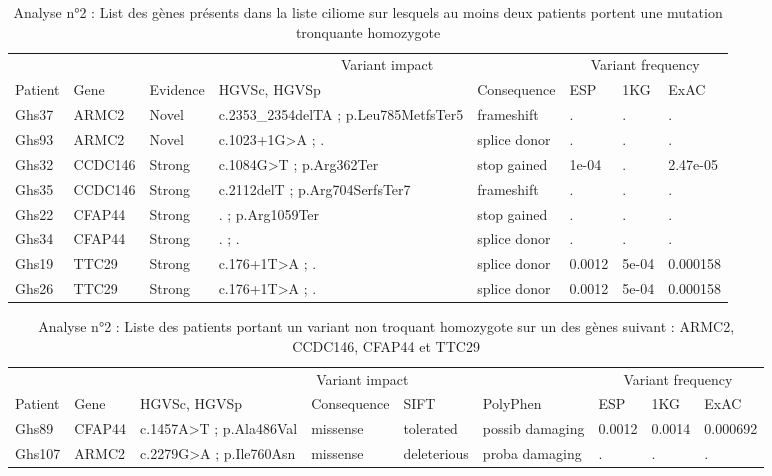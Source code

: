\documentclass[12pt,twoside]{reedthesis}
\theoremstyle{definition}
\theoremstyle{definition}
\theoremstyle{remark}
\begin{document}
  \begin{landscape}
  \begin{longtable}[t]{llllllll}
  \caption{\label{tab:tabgrp1high}Analyse n°2 : List des gènes présents dans la liste ciliome sur lesquels au moins deux patients portent une mutation tronquante homozygote}\\
  \toprule
  \multicolumn{1}{c}{ } & \multicolumn{1}{c}{ } & \multicolumn{1}{c}{ } & \multicolumn{2}{c}{Variant impact} & \multicolumn{3}{c}{Variant frequency} \\
  \cmidrule(l{2pt}r{2pt}){4-5} \cmidrule(l{2pt}r{2pt}){6-8}
  Patient & Gene & Evidence & HGVSc, HGVSp & Consequence & ESP & 1KG & ExAC\\
  \midrule
  Ghs37 & ARMC2 & Novel & c.2353\_2354delTA ; p.Leu785MetfsTer5 & frameshift & . & . & .\\
  Ghs93 & ARMC2 & Novel & c.1023+1G>A ; . & splice donor & . & . & .\\
  Ghs32 & CCDC146 & Strong & c.1084G>T ; p.Arg362Ter & stop gained & 1e-04 & . & 2.47e-05\\
  Ghs35 & CCDC146 & Strong & c.2112delT ; p.Arg704SerfsTer7 & frameshift & . & . & .\\
  Ghs22 & CFAP44 & Strong & . ; p.Arg1059Ter & stop gained & . & . & .\\
  \addlinespace
  Ghs34 & CFAP44 & Strong & . ; . & splice donor & . & . & .\\
  Ghs19 & TTC29 & Strong & c.176+1T>A ; . & splice donor & 0.0012 & 5e-04 & 0.000158\\
  Ghs26 & TTC29 & Strong & c.176+1T>A ; . & splice donor & 0.0012 & 5e-04 & 0.000158\\
  \bottomrule
  \end{longtable}
  \end{landscape}
  
  \begin{landscape}
  \begin{longtable}[t]{lllllllll}
  \caption{\label{tab:tabgrp1moderate}Analyse n°2 : Liste des patients portant un variant non troquant homozygote sur un des gènes suivant : ARMC2, CCDC146, CFAP44  et  TTC29}\\
  \toprule
  \multicolumn{1}{c}{ } & \multicolumn{1}{c}{ } & \multicolumn{4}{c}{Variant impact} & \multicolumn{3}{c}{Variant frequency} \\
  \cmidrule(l{2pt}r{2pt}){3-6} \cmidrule(l{2pt}r{2pt}){7-9}
  Patient & Gene & HGVSc, HGVSp & Consequence & SIFT & PolyPhen & ESP & 1KG & ExAC\\
  \midrule
  Ghs89 & CFAP44 & c.1457A>T ; p.Ala486Val & missense & tolerated & possib damaging & 0.0012 & 0.0014 & 0.000692\\
  Ghs107 & ARMC2 & c.2279G>A ; p.Ile760Asn & missense & deleterious & proba damaging & . & . & .\\
  \bottomrule
  \end{longtable}
  \end{landscape}
  
\end{document}
